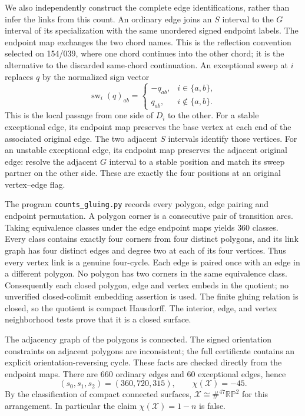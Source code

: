 \documentclass[11pt,a4paper]{article}
\begin{document}
We also independently construct the complete edge identifications,
rather than infer the links from this count. An ordinary edge joins
an $S$ interval to the $G$ interval of its specialization with the
same unordered signed endpoint labels. The endpoint map exchanges
the two chord names. This is the reflection convention selected on
154/039, where one chord continues into the other chord; it is the
alternative to the discarded same-chord continuation. An exceptional
sweep at $i$ replaces $q$ by the normalized sign vector
\[
 \operatorname{sw}_i(q)_{ab}=
 \begin{cases}
   -q_{ab},&i\in\{a,b\},\\
   q_{ab},&i\notin\{a,b\}.
 \end{cases}                                  \tag{C.5}
\]
This is the local passage from one side of $D_i$ to the other.
For a stable exceptional edge, its endpoint map preserves the base
vertex at each end of the associated original edge. The two
adjacent $S$ intervals identify those vertices. For an unstable
exceptional edge, its endpoint map preserves the adjacent original
edge: resolve the adjacent $G$ interval to a stable position and
match its sweep partner on the other side. These are exactly the
four positions at an original vertex--edge flag.

The program \texttt{counts\_gluing.py} records every polygon, edge
pairing and endpoint permutation. A polygon corner is a consecutive
pair of transition arcs. Taking equivalence classes under the edge
endpoint maps yields $360$ classes. Every class contains exactly
four corners from four distinct polygons, and its link graph has
four distinct edges and degree two at each of its four vertices.
Thus every vertex link is a genuine four-cycle. Each edge is
paired once with an edge in a different polygon. No polygon has
two corners in the same equivalence class. Consequently each
closed polygon, edge and vertex embeds in the quotient; no
unverified closed-colimit embedding assertion is used. The finite
gluing relation is closed, so the quotient is compact Hausdorff.
The interior, edge, and vertex neighborhood tests prove that it is
a closed surface.

The adjacency graph of the polygons is connected. The signed
orientation constraints on adjacent polygons are inconsistent;
the full certificate contains an explicit orientation-reversing
cycle. These facts are checked directly from the endpoint maps.
There are $660$ ordinary edges and $60$ exceptional edges, hence
\[
 (s_0,s_1,s_2)=(360,720,315),\qquad
 \chi(\mathcal X)=-45.
\]
By the classification of compact connected surfaces,
$\mathcal X\cong\#^{47}\mathbb{RP}^2$ for this arrangement.
In particular the claim $\chi(\mathcal X)=1-n$ is false.
\end{document}
